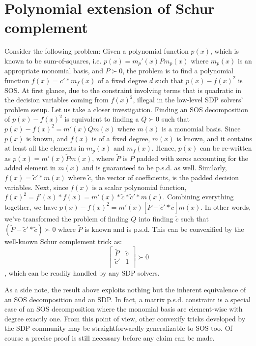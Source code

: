 \documentclass{article}
\begin{document}
\section{Polynomial extension of Schur complement} %
\label{sec:polynomial_extension_to_schur_complement}
Consider the following problem: Given a polynomial function $p(x)$, which is known to be sum-of-squares, i.e. $p(x)=m_p'(x)Pm_p(x)$ where $m_p(x)$ is an appropriate monomial basis, and $P\succ 0$, the problem is to find a polynomial function $f(x)=c'*m_f(x)$ of a fixed degree $d$ such that $p(x)-f(x)^2$ is SOS. At first glance, due to the constraint involving terms that is quadratic in the decision variables coming from $f(x)^2$, illegal in the low-level SDP solvers' problem setup. Let us take a closer investigation. Finding an SOS decomposition of $p(x)-f(x)^2$ is equivalent to finding a $Q \succ 0$ such that $p(x)-f(x)^2=m'(x)Qm(x)$ where $m(x)$ is a monomial basis. Since $p(x)$ is known, and $f(x)$ is of a fixed degree, $m(x)$ is known, and it contains at least all the elements in $m_p(x)$ and $m_f(x)$. Hence, $p(x)$ can be re-written as $p(x)=m'(x)\tilde{P}m(x)$, where $\tilde{P}$ is $P$ padded with zeros accounting for the added element in $m(x)$ and is guaranteed to be p.s.d. as well. Similarly, $f(x)=\tilde{c}'*m(x)$ where $\tilde{c}$, the vector of coefficients, is the padded decision variables. Next, since $f(x)$ is a scalar polynomial function, $f(x)^2=f'(x)*f(x)=m'(x)*\tilde{c}*\tilde{c}'*m(x)$. Combining everything together, we have $p(x)-f(x)^2=m'(x)[\tilde{P}-\tilde{c}'*\tilde{c}]m(x)$. In other words, we've transformed the problem of finding $Q$ into finding $\tilde{c}$ such that $(\tilde{P}-\tilde{c}'*\tilde{c})\succ 0$ where $\tilde{P}$ is known and is p.s.d. This can be convexified by the well-known Schur complement trick as:
\[
\begin{bmatrix}
  \tilde{P} & \tilde{c}\\
  \tilde{c}' & 1 \\
\end{bmatrix}\succ 0 \], which can be readily handled by any SDP solvers. 


As a side note, the result above exploits nothing but the inherent equivalence of an SOS decomposition and an SDP. In fact, a matrix p.s.d. constraint is a special case of an SOS decomposition where the monomial basis are element-wise with degree exactly one. From this point of view, other convexify tricks developed by the SDP community may be straightforwardly generalizable to SOS too. Of course a precise proof is still necessary before any claim can be made.  
\end{document}
